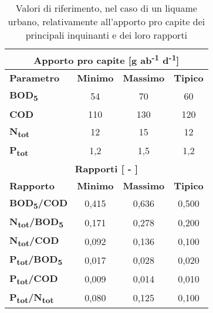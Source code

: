 \begin{table}[h]
	\scriptsize
	\begin{center}
		\begin{tabular}{|l|c|c|c|}
			\hline
			\multicolumn{4}{|c|}{\textbf{Apporto pro capite {[}g ab\textsuperscript{-1} d\textsuperscript{-1}{]}}}     \\ \hline
			\textbf{Parametro} & \textbf{Minimo} & \textbf{Massimo} & \textbf{Tipico} \\ \hline
			\textbf{BOD\textsubscript{5}}      & 54              & 70               & 60              \\ \hline
			\textbf{COD}       & 110             & 130              & 120             \\ \hline
			\textbf{N\textsubscript{tot}}      & 12              & 15               & 12              \\ \hline
			\textbf{P\textsubscript{tot}}      & 1,2             & 1,5              & 1,2             \\ \hline
			\multicolumn{4}{|c|}{\textbf{Rapporti {[} - {]}}}                         \\ \hline
			\textbf{Rapporto}  & \textbf{Minimo} & \textbf{Massimo} & \textbf{Tipico} \\ \hline
			\textbf{BOD\textsubscript{5}/COD}  & 0,415           & 0,636            & 0,500           \\ \hline
			\textbf{N\textsubscript{tot}/BOD\textsubscript{5}} & 0,171           & 0,278            & 0,200           \\ \hline
			\textbf{N\textsubscript{tot}/COD}  & 0,092           & 0,136            & 0,100           \\ \hline
			\textbf{P\textsubscript{tot}/BOD\textsubscript{5}} & 0,017           & 0,028            & 0,020           \\ \hline
			\textbf{P\textsubscript{tot}/COD}  & 0,009           & 0,014            & 0,010           \\ \hline
			\textbf{P\textsubscript{tot}/N\textsubscript{tot}} & 0,080           & 0,125            & 0,100           \\ \hline
		\end{tabular}
		\caption{Valori di riferimento, nel caso di un liquame urbano, relativamente all'apporto pro capite dei principali inquinanti e dei loro rapporti \cite{bonomo2008trattamenti} \cite{tuning}}
		\label{tab:ppc_rapporti}
	\end{center}
\end{table}

